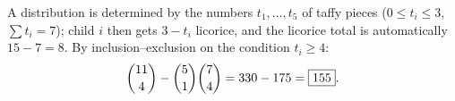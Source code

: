 A distribution is determined by the numbers $t_1,\dots,t_5$ of taffy pieces ($0\le t_i\le3$, $\sum t_i=7$); child $i$ then gets $3-t_i$ licorice, and the licorice total is automatically $15-7=8$. By inclusion--exclusion on the condition $t_i\ge4$:
\[\dbinom{11}{4}-\dbinom51\dbinom74=330-175=\boxed{155}.\]
